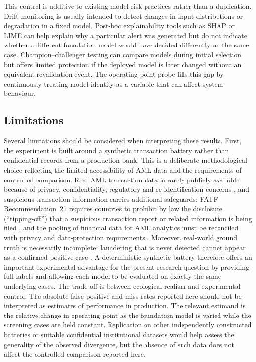 \documentclass[pdflatex,sn-basic,Numbered]{sn-jnl}
\begin{document}
This control is additive to existing model risk practices rather than a duplication. Drift monitoring is usually intended to detect changes in input distributions or degradation in a fixed model. Post-hoc explainability tools such as SHAP or LIME can help explain why a particular alert was generated but do not indicate whether a different foundation model would have decided differently on the same case. Champion--challenger testing can compare models during initial selection but offers limited protection if the deployed model is later changed without an equivalent revalidation event. The operating point probe fills this gap by continuously treating model identity as a variable that can affect system behaviour.

\subsection{Limitations}\label{sec:limits}

Several limitations should be considered when interpreting these results. First, the experiment is built around a synthetic transaction battery rather than confidential records from a production bank. This is a deliberate methodological choice reflecting the limited accessibility of AML data and the requirements of controlled comparison. Real AML transaction data is rarely publicly available because of privacy, confidentiality, regulatory and re-identification concerns \cite{jensen}, and suspicious-transaction information carries additional safeguards: FATF Recommendation~21 requires countries to prohibit by law the disclosure (``tipping-off'') that a suspicious transaction report or related information is being filed \cite{fatf-recs}, and the pooling of financial data for AML analytics must be reconciled with privacy and data-protection requirements \cite{fatf-datapooling}. Moreover, real-world ground truth is necessarily incomplete: laundering that is never detected cannot appear as a confirmed positive case \cite{altman}. A deterministic synthetic battery therefore offers an important experimental advantage for the present research question by providing full labels and allowing each model to be evaluated on exactly the same underlying cases. The trade-off is between ecological realism and experimental control. The absolute false-positive and miss rates reported here should not be interpreted as estimates of performance in production. The relevant estimand is the relative change in operating point as the foundation model is varied while the screening cases are held constant. Replication on other independently constructed batteries or suitable confidential institutional datasets would help assess the generality of the observed divergence, but the absence of such data does not affect the controlled comparison reported here.
\end{document}
